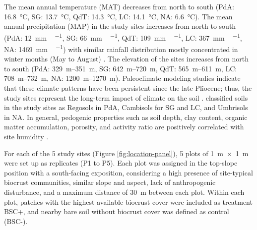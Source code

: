 The mean annual temperature (MAT) decreases from north to south (PdA: \SI{16.8}{\celsius}, SG: \SI{13.7}{\celsius}, QdT: \SI{14.3}{\celsius}, LC: \SI{14.1}{\celsius}, NA: \SI{6.6}{\celsius}). The mean annual precipitation (MAP) in the study sites increases from north to south (PdA: \SI{12}{\milli\metre\,\year^{-1}}, SG: \SI{66}{\milli\metre\,\year^{-1}}, QdT: \SI{109}{\milli\metre\,\year^{-1}}, LC: \SI{367}{\milli\metre\,\year^{-1}}, NA: \SI{1469}{\milli\metre\,\year^{-1}}) with similar rainfall distribution mostly concentrated in winter months (May to August) \citep{Bernhard2018,Santibnez2017}. The elevation of the sites increases from north to south (PdA: \SIrange{329}{351}{\meter}, SG: \SIrange{642}{720}{\meter}, QdT: \SIrange{565}{611}{\meter}, LC: \SIrange{708}{732}{\meter}, NA: \SIrange{1200}{1270}{\meter}). Paleoclimate modeling studies \citep{Mutz2018} indicate that these climate patterns have been persistent since the late Pliocene; thus, the study sites represent the long-term impact of climate on the soil \citep{Ewing2006}. \citet{Bernhard2018} classified soils in the study sites as Regosols in PdA, Cambisols for SG and LC, and Umbrisols in NA. In general, pedogenic properties such as soil depth, clay content, organic matter accumulation, porosity, and activity ratio are positively correlated with site humidity \citep{Bernhard2018}.

For each of the 5 study sites (Figure \ref{fig:location-panel}), 5 plots of \SI{1}{\meter}~$\times$~\SI{1}{\meter} were set up as replicates (P1 to P5). Each plot was assigned in the top-slope position with a south-facing exposition, considering a high presence of site-typical biocrust communities, similar slope and aspect, lack of anthropogenic disturbance, and a maximum distance of \SI{30}{\meter} between each plot. Within each plot, patches with the highest available biocrust cover were included as treatment BSC+, and nearby bare soil without biocrust cover was defined as control (BSC-). \newline

